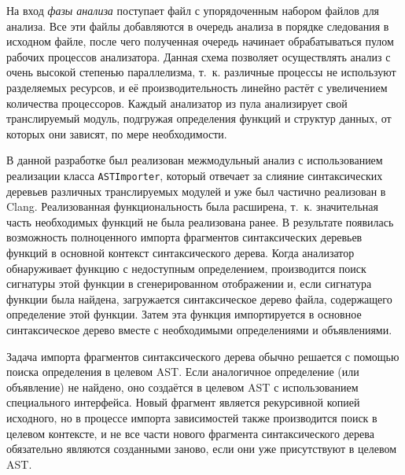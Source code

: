 На вход \textit{фазы анализа} поступает файл с упорядоченным набором файлов для анализа. Все эти файлы добавляются в очередь анализа в порядке следования в исходном файле, после чего полученная очередь начинает обрабатываться пулом рабочих процессов анализатора. Данная схема позволяет осуществлять анализ с очень высокой степенью параллелизма, т.~к. различные процессы не используют разделяемых ресурсов, и её производительность линейно растёт с увеличением количества процессоров. Каждый анализатор из пула анализирует свой транслируемый модуль, подгружая определения функций и структур данных, от которых они зависят, по мере необходимости.

В данной разработке был реализован межмодульный анализ с использованием реализации класса \texttt{ASTImporter}, который отвечает за слияние синтаксических деревьев различных транслируемых модулей и уже был частично реализован в Clang. Реализованная функциональность была расширена, т.~к. значительная часть необходимых функций не была реализована ранее. В результате появилась возможность полноценного импорта фрагментов синтаксических деревьев функций в основной контекст синтаксического дерева. Когда анализатор обнаруживает функцию с недоступным определением, производится поиск сигнатуры этой функции в сгенерированном отображении и, если сигнатура функции была найдена, загружается синтаксическое дерево файла, содержащего определение этой функции. Затем эта функция импортируется в основное синтаксическое дерево вместе с необходимыми определениями и объявлениями.

Задача импорта фрагментов синтаксического дерева обычно решается с помощью поиска определения в целевом AST. Если аналогичное определение (или объявление) не найдено, оно создаётся в целевом AST с использованием специального интерфейса. Новый фрагмент является рекурсивной копией исходного, но в процессе импорта зависимостей также производится поиск в целевом контексте, и не все части нового фрагмента синтаксического дерева обязательно являются созданными заново, если они уже присутствуют в целевом AST.

